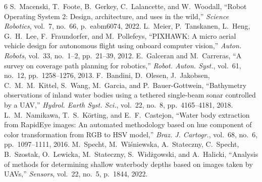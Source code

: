 \documentclass[9pt,twocolumn]{article}
\begin{document}
{\footnotesize

\begin{thebibliography}{6}
 S.~Macenski, T.~Foote, B.~Gerkey, C.~Lalancette, and W.~Woodall, ``Robot Operating System 2: Design, architecture, and uses in the wild,'' \emph{Science Robotics}, vol.~7, no.~66, p.~eabm6074, 2022.
 L.~Meier, P.~Tanskanen, L.~Heng, G.~H.~Lee, F.~Fraundorfer, and M.~Pollefeys, ``PIXHAWK: A micro aerial vehicle design for autonomous flight using onboard computer vision,'' \emph{Auton. Robots}, vol.~33, no.~1--2, pp.~21--39, 2012.
 E.~Galceran and M.~Carreras, ``A survey on coverage path planning for robotics,'' \emph{Robot. Auton. Syst.}, vol.~61, no.~12, pp.~1258--1276, 2013.
 F.~Bandini, D.~Olesen, J.~Jakobsen, C.~M.~M.~Kittel, S.~Wang, M.~Garcia, and P.~Bauer-Gottwein, ``Bathymetry observations of inland water bodies using a tethered single-beam sonar controlled by a UAV,'' \emph{Hydrol. Earth Syst. Sci.}, vol.~22, no.~8, pp.~4165--4181, 2018.
 L.~M.~Namikawa, T.~S.~K\"{o}rting, and E.~F.~Castejon, ``Water body extraction from RapidEye images: An automated methodology based on hue component of color transformation from RGB to HSV model,'' \emph{Braz. J. Cartogr.}, vol.~68, no.~6, pp.~1097--1111, 2016.
 M.~Specht, M.~Wi\'{s}niewska, A.~Stateczny, C.~Specht, B.~Szostak, O.~Lewicka, M.~Stateczny, S.~Wid\.{z}gowski, and A.~Halicki, ``Analysis of methods for determining shallow waterbody depths based on images taken by UAVs,'' \emph{Sensors}, vol.~22, no.~5, p.~1844, 2022.
\end{thebibliography}}
\end{document}
